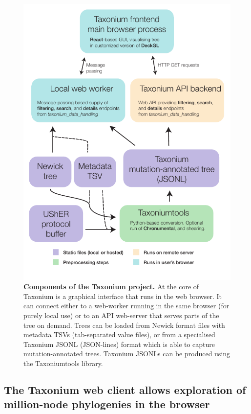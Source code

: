 \documentclass[twocolumn]{bioRxiv}
\begin{document}
\begin{figure}

\begin{center}
\includegraphics[width=\linewidth]{Figures/TaxoniumFlowChart.pdf}
\end{center}
\caption{\textbf{Components of the Taxonium project.} At the core of Taxonium is a graphical interface that runs in the web browser. It can connect either to a web-worker running in the same browser (for purely local use) or to an API web-server that serves parts of the tree on demand. Trees can be loaded from Newick format files with metadata TSVs (tab-separated value files), or from a specialised Taxonium JSONL (JSON-lines) format which is able to capture mutation-annotated trees. Taxonium JSONLs can be produced using the Taxoniumtools library.}
\label{fig:flowchart}
\end{figure}

\subsection*{The Taxonium web client allows exploration of million-node phylogenies in the browser}
\end{document}

